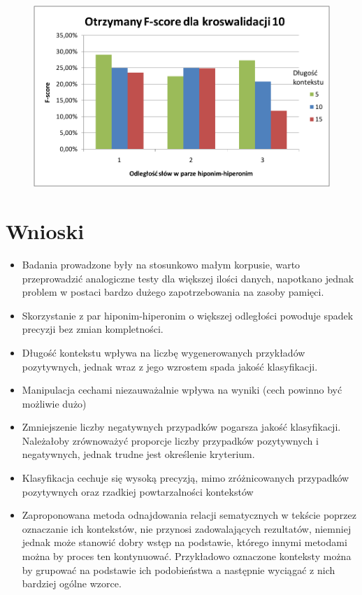 \documentclass[a4paper,10pt]{report}
\begin{document}
\begin{figure}[h]
\centering
 \includegraphics[width=13cm]{img/image003.png}
 \caption{}
\label{fig:wykres}
\end{figure} 

\section{Wnioski}


\begin{itemize}
\item Badania prowadzone były na stosunkowo małym korpusie, warto przeprowadzić analogiczne testy dla większej ilości danych,
napotkano jednak problem w postaci bardzo dużego zapotrzebowania na zasoby pamięci.  

\item Skorzystanie z par hiponim-hiperonim o większej odległości powoduje spadek precyzji bez zmian kompletności.

\item Długość kontekstu wpływa na liczbę wygenerowanych przykładów pozytywnych, jednak wraz z jego wzrostem spada jakość klasyfikacji.

\item Manipulacja cechami niezauważalnie wpływa na wyniki (cech powinno być możliwie dużo)

\item Zmniejszenie liczby negatywnych przypadków pogarsza jakość klasyfikacji. Należałoby zrównoważyć proporcje liczby przypadków pozytywnych i negatywnych, jednak trudne jest określenie kryterium.

\item Klasyfikacja cechuje się wysoką precyzją, mimo zróżnicowanych przypadków pozytywnych oraz rzadkiej powtarzalności kontekstów

\item Zaproponowana metoda odnajdowania relacji sematycznych w tekście poprzez oznaczanie ich kontekstów, nie przynosi zadowalających rezultatów, niemniej jednak może stanowić dobry wstęp na podstawie, którego innymi metodami można by proces ten kontynuować. Przykładowo oznaczone konteksty można by grupować na podstawie ich podobieństwa a następnie wyciągać z nich bardziej ogólne wzorce.

\end{itemize}


\nocite{*}

\end{document}
